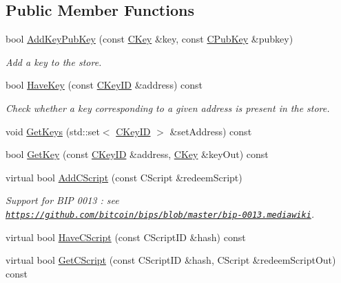 \subsection*{Public Member Functions}
\begin{DoxyCompactItemize}
\item 
bool \mbox{\hyperlink{class_c_basic_key_store_acc2e33f319de88e88f86b0dc79bdcb65}{Add\+Key\+Pub\+Key}} (const \mbox{\hyperlink{class_c_key}{C\+Key}} \&key, const \mbox{\hyperlink{class_c_pub_key}{C\+Pub\+Key}} \&pubkey)
\begin{DoxyCompactList}\small\item\em Add a key to the store. \end{DoxyCompactList}\item 
bool \mbox{\hyperlink{class_c_basic_key_store_afc99762e3e58f93e198d85ecfdf5804a}{Have\+Key}} (const \mbox{\hyperlink{class_c_key_i_d}{C\+Key\+ID}} \&address) const
\begin{DoxyCompactList}\small\item\em Check whether a key corresponding to a given address is present in the store. \end{DoxyCompactList}\item 
void \mbox{\hyperlink{class_c_basic_key_store_a41f3895021dae008582ceb55a98b0891}{Get\+Keys}} (std\+::set$<$ \mbox{\hyperlink{class_c_key_i_d}{C\+Key\+ID}} $>$ \&set\+Address) const
\item 
bool \mbox{\hyperlink{class_c_basic_key_store_a69328ee642e4234922356f59876e956d}{Get\+Key}} (const \mbox{\hyperlink{class_c_key_i_d}{C\+Key\+ID}} \&address, \mbox{\hyperlink{class_c_key}{C\+Key}} \&key\+Out) const
\item 
virtual bool \mbox{\hyperlink{class_c_basic_key_store_a56249ce3540398999cd397eeb662e836}{Add\+C\+Script}} (const C\+Script \&redeem\+Script)
\begin{DoxyCompactList}\small\item\em Support for B\+IP 0013 \+: see \href{https://github.com/bitcoin/bips/blob/master/bip-0013.mediawiki}{\tt https\+://github.\+com/bitcoin/bips/blob/master/bip-\/0013.\+mediawiki}. \end{DoxyCompactList}\item 
virtual bool \mbox{\hyperlink{class_c_basic_key_store_a499e0a1d117b43e3200883d88a400bf6}{Have\+C\+Script}} (const C\+Script\+ID \&hash) const
\item 
virtual bool \mbox{\hyperlink{class_c_basic_key_store_a975abe0f2efa3e0e2270d3714d73010a}{Get\+C\+Script}} (const C\+Script\+ID \&hash, C\+Script \&redeem\+Script\+Out) const

\end{DoxyCompactItemize}

